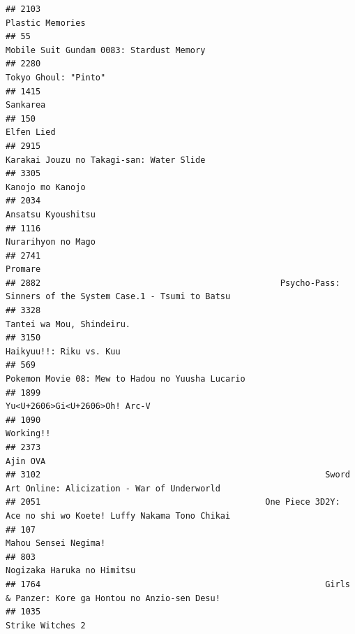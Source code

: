 \documentclass[
]{article}
\begin{document}
\begin{verbatim}
## 2103                                                                                          Plastic Memories
## 55                                                                    Mobile Suit Gundam 0083: Stardust Memory
## 2280                                                                                      Tokyo Ghoul: "Pinto"
## 1415                                                                                                  Sankarea
## 150                                                                                                 Elfen Lied
## 2915                                                                  Karakai Jouzu no Takagi-san: Water Slide
## 3305                                                                                          Kanojo mo Kanojo
## 2034                                                                                        Ansatsu Kyoushitsu
## 1116                                                                                        Nurarihyon no Mago
## 2741                                                                                                   Promare
## 2882                                                Psycho-Pass: Sinners of the System Case.1 - Tsumi to Batsu
## 3328                                                                                 Tantei wa Mou, Shindeiru.
## 3150                                                                                   Haikyuu!!: Riku vs. Kuu
## 569                                                           Pokemon Movie 08: Mew to Hadou no Yuusha Lucario
## 1899                                                                             Yu<U+2606>Gi<U+2606>Oh! Arc-V
## 1090                                                                                                 Working!!
## 2373                                                                                                  Ajin OVA
## 3102                                                         Sword Art Online: Alicization - War of Underworld
## 2051                                             One Piece 3D2Y: Ace no shi wo Koete! Luffy Nakama Tono Chikai
## 107                                                                                       Mahou Sensei Negima!
## 803                                                                                 Nogizaka Haruka no Himitsu
## 1764                                                         Girls & Panzer: Kore ga Hontou no Anzio-sen Desu!
## 1035                                                                                          Strike Witches 2

\end{verbatim}
\end{document}

